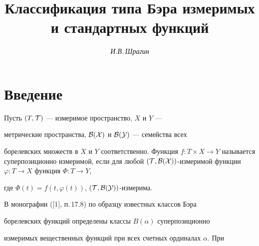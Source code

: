 

 


\author{\it И.В.\,Шрагин} 




\title{Классификация типа Бэра измеримых и стандартных функций} 


 


\date{} 




\pagestyle{plain} %


 




\maketitle 


\label{begin} 


 


 


\section*{Введение} 


 


 


Пусть $(T,\cal T)$ --- измеримое пространство, $X$ и $Y$ --- 


метрические пространства, $\cal B(X)$ и $\cal B(Y)$ --- семейства всех 


борелевских множеств в $X$ и $Y$ соответственно. Функция $f:T\times 


X\to Y$ называется суперпозиционно измеримой, если для любой $(\cal 


T,\cal B(X))$-измеримой функции $\varphi:T\to X$ функция $\Phi:T\to Y$, 


где $\Phi(t)=f(t,\varphi(t))$, $(\cal T,\cal B(Y))$-измерима. 


 


В монографии ([1], п.\,17.8) по образцу известных классов Бэра 


борелевских функций определены классы $B(\alpha)$ суперпозиционно 


измеримых вещественных функций при всех счетных ординалах $\alpha$. При 



